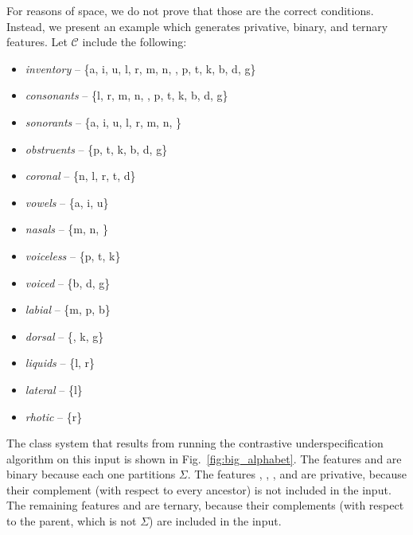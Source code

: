 \documentclass[11pt, oneside]{article}   	%
\begin{document}
\vspace{\baselineskip} For reasons of space, we do not prove that those are the correct conditions. Instead, we present an example which generates privative, binary, and ternary features. Let $\mathcal C$ include the following: \begin{itemize}
    \item \textit{inventory} -- \{a, i, u, l, r, m, n, , p, t, k, b, d, g\}
    \item \textit{consonants} -- \{l, r, m, n, , p, t, k, b, d, g\}
    \item \textit{sonorants} -- \{a, i, u, l, r, m, n, \}
    \item \textit{obstruents} -- \{p, t, k, b, d, g\}
    \item \textit{coronal} -- \{n, l, r, t, d\}
    \item \textit{vowels} -- \{a, i, u\}
    \item \textit{nasals} -- \{m, n, \}
    \item \textit{voiceless} -- \{p, t, k\}
    \item \textit{voiced} -- \{b, d, g\}
    \item \textit{labial} -- \{m, p, b\}
    \item \textit{dorsal} -- \{, k, g\}
    \item \textit{liquids} -- \{l, r\}
    \item \textit{lateral} -- \{l\}
    \item \textit{rhotic} -- \{r\}
    \end{itemize}
The class system that results from running the contrastive underspecification algorithm on this input is shown in Fig.~\ref{fig:big_alphabet}. The features  and  are binary because each one partitions $\Sigma$. The features , , ,  and  are privative, because their complement (with respect to every ancestor) is not included in the input. The remaining features  and  are ternary, because their complements (with respect to the parent, which is not $\Sigma$) are included in the input.
\end{document}
